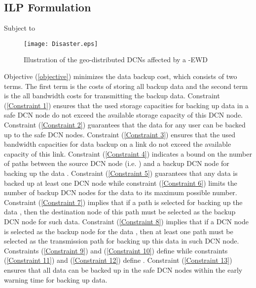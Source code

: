 \documentclass[conference]{IEEEtran}\IEEEoverridecommandlockouts
\begin{document}
 \subsection{ILP Formulation}\label{ILP Formulation}





 Subject to
 
  
 
 
 
   



  


  

 

 

 

\begin{figure}[t]
      \centering
      \texttt{[image: Disaster.eps]}
   \caption{Illustration of the geo-distributed DCNs affected by a   -EWD}
   \label{fig:Illustration of the affect on geo-distributed DCNs from a disaster}
  \end{figure}

  Objective (\ref{objective}) minimizes the data backup cost, which consists of two terms. The first term is the costs of storing all backup data and the second term is the all bandwidth costs for transmitting the backup data.   Constraint (\ref{Constraint 1}) ensures that the used storage capacities  for backing up data in a safe DCN node do not exceed the available storage capacity of this DCN node. Constraint (\ref{Constraint 2}) guarantees that the data for any user can be backed up to the safe DCN nodes. Constraint (\ref{Constraint 3}) ensures that the used bandwidth capacities for data backup on a link do not exceed the available capacity of this link.  Constraint (\ref{Constraint 4}) indicates a bound on the number of paths between the source DCN node (i.e. ) and a  backup DCN node for backing up the data .  Constraint (\ref{Constraint 5}) guarantees that any data  is backed up  at least one DCN node while constraint (\ref{Constraint 6}) limits the number of backup DCN nodes for the data  to its maximum possible number. Constraint (\ref{Constraint 7}) implies that if a path is selected for backing up the data   , then the destination node of this path must be selected as the backup DCN node for such data. Constraint (\ref{Constraint 8}) implies that if a DCN node is selected as the backup node for the data   , then  at least one path  must be selected as the transmission path  for backing up this data  in such DCN node.  Constraints (\ref{Constraint 9}) and (\ref{Constraint 10}) define  while constraints (\ref{Constraint 11}) and (\ref{Constraint 12}) define .  Constraint (\ref{Constraint 13}) ensures that all data can be backed up in the safe DCN nodes within the  early warning  time for backing up data.
\end{document}
